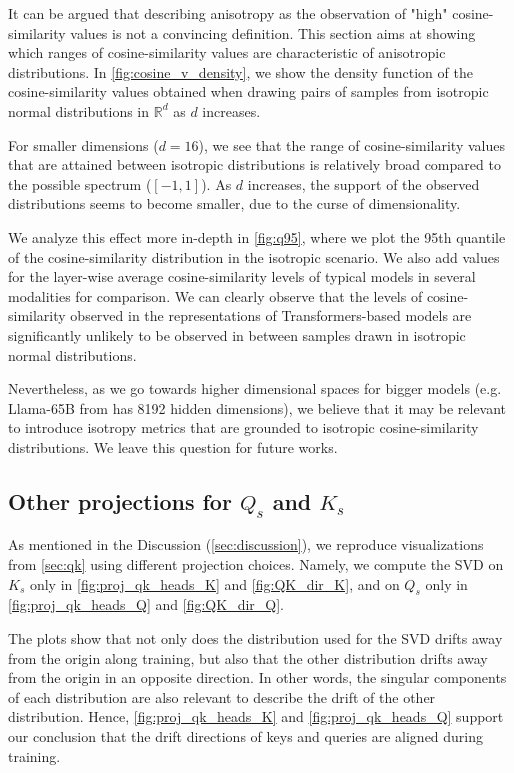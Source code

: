 It can be argued that describing anisotropy as the observation of "high" cosine-similarity values is not a convincing definition. This section aims at showing which ranges of cosine-similarity values are characteristic of anisotropic distributions. 
In \autoref{fig:cosine_v_density}, we show the density function of the cosine-similarity values obtained when drawing pairs of samples from isotropic normal distributions in $\mathbb{R}^d$ as $d$ increases. 

For smaller dimensions ($d=16$), we see that the range of cosine-similarity values that are attained between isotropic distributions is relatively broad compared to the possible spectrum ($[-1, 1]$). As $d$ increases, the support of the observed distributions seems to become smaller, due to the curse of dimensionality.

We analyze this effect more in-depth in \autoref{fig:q95}, where we plot the 95th quantile of the cosine-similarity distribution in the isotropic scenario. We also add values for the layer-wise average cosine-similarity levels of typical models in several modalities for comparison. We can clearly observe that the levels of cosine-similarity observed in the representations of Transformers-based models are significantly unlikely to be observed in between samples drawn in isotropic normal distributions.

Nevertheless, as we go towards higher dimensional spaces for bigger models (e.g. Llama-65B from \citet{touvron2023llama} has 8192 hidden dimensions), we believe that it may be relevant to introduce isotropy metrics that are grounded to isotropic cosine-similarity distributions. We leave this question for future works.

\subsection{Other projections for $Q_s$ and $K_s$}
\label{sec:other_projs}
As mentioned in the Discussion (\autoref{sec:discussion}), we reproduce visualizations from \autoref{sec:qk} using different projection choices. Namely, we compute the SVD on $K_s$ only in \autoref{fig:proj_qk_heads_K} and \autoref{fig:QK_dir_K}, and on $Q_s$ only in \autoref{fig:proj_qk_heads_Q} and \autoref{fig:QK_dir_Q}.

The plots show that not only does the distribution used for the SVD drifts away from the origin along training, but also that the other distribution drifts away from the origin in an opposite direction. In other words, the singular components of each distribution are also relevant to describe the drift of the other distribution. Hence, \autoref{fig:proj_qk_heads_K} and \autoref{fig:proj_qk_heads_Q} support our conclusion that the drift directions of keys and queries are aligned during training.


